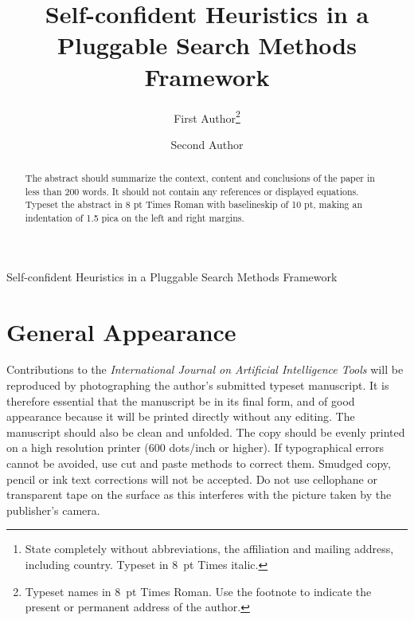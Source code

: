\documentclass{ws-ijait}
\begin{document}
{Self-confident Heuristics in a Pluggable Search Methods Framework}

%
\catchline{}{}{}{}{}
%

\title{Self-confident Heuristics in a Pluggable Search Methods Framework}

\author{First Author\footnote{
Typeset names in 8~pt Times Roman. Use the footnote
to indicate the present or permanent address of the author.}}

\address{University Department, University Name, Address\\
City, State ZIP/Zone,
Country\footnote{State completely without abbreviations, the
affiliation and mailing address, including country. Typeset in 8~pt
Times italic.}\\
first\_author@university.edu}

\author{Second Author}

\address{Group, Laboratory, Address\\
City, State ZIP/Zone, Country\\
second\_author@group.com}

\maketitle

\begin{history}
\end{history}

\begin{abstract}
The abstract should summarize the context, content
and conclusions of the paper in less than 200 words. It should
not contain any references or displayed equations. Typeset the
abstract in 8 pt Times Roman with baselineskip of 10 pt, making
an indentation of 1.5 pica on the left and right margins.
\end{abstract}


\section{General Appearance}

Contributions to the {\it International Journal on Artificial
Intelligence Tools} will be\break
reproduced by photographing the author's submitted typeset
manuscript. It is therefore essential that the manuscript be in its
final form, and of good appearance because it will be printed directly
without any editing. The manuscript should also be clean and
unfolded. The copy should be evenly printed on a high resolution
printer (600 dots/inch or higher).  If typographical errors cannot be
avoided, use cut and paste methods to correct them. Smudged copy,
pencil or ink text corrections will not be accepted. Do not use
cellophane or transparent tape on the surface as this interferes with
the picture taken by the publisher's camera.
\end{document}
